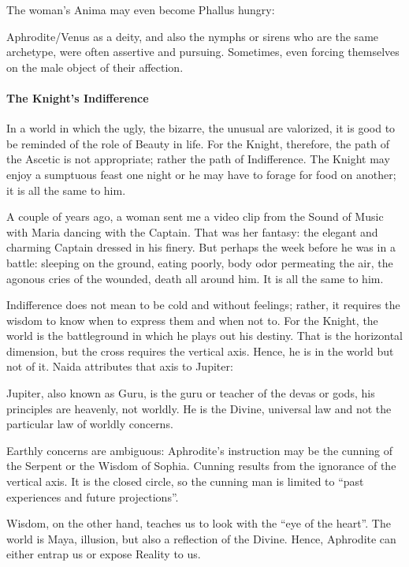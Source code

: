 The woman's Anima may even become Phallus hungry:

\begin{quotex}
Aphrodite/Venus as a deity, and also the nymphs or sirens who are the same archetype, were often assertive and pursuing. Sometimes, even forcing themselves on the male object of their affection.
\end{quotex}


\paragraph{The Knight's Indifference}


In a world in which the ugly, the bizarre, the unusual are valorized, it is good to be reminded of the role of Beauty in life. For the Knight, therefore, the path of the Ascetic is not appropriate; rather the path of Indifference. The Knight may enjoy a sumptuous feast one night or he may have to forage for food on another; it is all the same to him.

A couple of years ago, a woman sent me a video clip from the Sound of Music with Maria dancing with the Captain. That was her fantasy: the elegant and charming Captain dressed in his finery. But perhaps the week before he was in a battle: sleeping on the ground, eating poorly, body odor permeating the air, the agonous cries of the wounded, death all around him. It is all the same to him.

Indifference does not mean to be cold and without feelings; rather, it requires the wisdom to know when to express them and when not to. For the Knight, the world is the battleground in which he plays out his destiny. That is the horizontal dimension, but the cross requires the vertical axis. Hence, he is in the world but not of it. Naida attributes that axis to Jupiter:

\begin{quotex}
Jupiter, also known as Guru, is the guru or teacher of the devas or gods, his principles are heavenly, not worldly. He is the Divine, universal law and not the particular law of worldly concerns.
\end{quotex}


Earthly concerns are ambiguous: Aphrodite's instruction may be the cunning of the Serpent or the Wisdom of Sophia. Cunning results from the ignorance of the vertical axis. It is the closed circle, so the cunning man is limited to ``past experiences and future projections''.

Wisdom, on the other hand, teaches us to look with the ``eye of the heart''. The world is Maya, illusion, but also a reflection of the Divine. Hence, Aphrodite can either entrap us or expose Reality to us.

